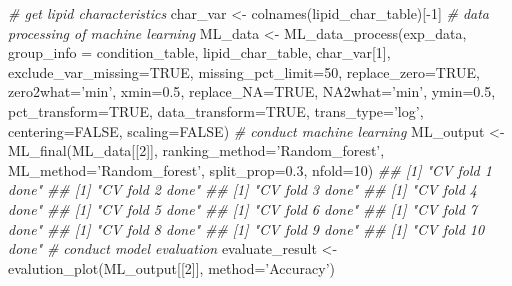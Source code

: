 \documentclass[]{article}
\newcommand{\hlnum}[1]{\textcolor[rgb]{0.816,0.125,0.439}{#1}}%
\newcommand{\hlstr}[1]{\textcolor[rgb]{0.251,0.627,0.251}{#1}}%
\newcommand{\hlcom}[1]{\textcolor[rgb]{0.502,0.502,0.502}{\textit{#1}}}%
\newcommand{\hlopt}[1]{\textcolor[rgb]{0,0,0}{#1}}%
\newcommand{\hlstd}[1]{\textcolor[rgb]{0.251,0.251,0.251}{#1}}%
\newcommand{\hlkwc}[1]{\textcolor[rgb]{0.251,0.251,0.251}{#1}}%
\newcommand{\hlkwd}[1]{\textcolor[rgb]{0.878,0.439,0.125}{#1}}%
\newenvironment{Shaded}{\begin{myshaded}}{\end{myshaded}}
\newcommand{\KeywordTok}[1]{\hlkwd{#1}}
\newcommand{\DataTypeTok}[1]{\hlkwc{#1}}
\newcommand{\DecValTok}[1]{\hlnum{#1}}
\newcommand{\FloatTok}[1]{\hlnum{#1}}
\newcommand{\StringTok}[1]{\hlstr{#1}}
\newcommand{\CommentTok}[1]{\hlcom{#1}}
\newcommand{\OtherTok}[1]{{#1}}
\newcommand{\OperatorTok}[1]{\hlopt{#1}}
\newcommand{\NormalTok}[1]{\hlstd{#1}}
\begin{document}
\begin{Shaded}
\begin{Highlighting}[]
\CommentTok{# get lipid characteristics}
\NormalTok{char_var <-}\StringTok{ }\KeywordTok{colnames}\NormalTok{(lipid_char_table)[}\OperatorTok{-}\DecValTok{1}\NormalTok{]}
\CommentTok{# data processing of machine learning}
\NormalTok{ML_data <-}\StringTok{ }\KeywordTok{ML_data_process}\NormalTok{(exp_data, }\DataTypeTok{group_info =}\NormalTok{ condition_table,}
\NormalTok{                           lipid_char_table, char_var[}\DecValTok{1}\NormalTok{],}
                           \DataTypeTok{exclude_var_missing=}\OtherTok{TRUE}\NormalTok{, }\DataTypeTok{missing_pct_limit=}\DecValTok{50}\NormalTok{,}
                           \DataTypeTok{replace_zero=}\OtherTok{TRUE}\NormalTok{, }\DataTypeTok{zero2what=}\StringTok{'min'}\NormalTok{, }\DataTypeTok{xmin=}\FloatTok{0.5}\NormalTok{,}
                           \DataTypeTok{replace_NA=}\OtherTok{TRUE}\NormalTok{, }\DataTypeTok{NA2what=}\StringTok{'min'}\NormalTok{, }\DataTypeTok{ymin=}\FloatTok{0.5}\NormalTok{,}
                           \DataTypeTok{pct_transform=}\OtherTok{TRUE}\NormalTok{, }\DataTypeTok{data_transform=}\OtherTok{TRUE}\NormalTok{,}
                           \DataTypeTok{trans_type=}\StringTok{'log'}\NormalTok{, }\DataTypeTok{centering=}\OtherTok{FALSE}\NormalTok{, }\DataTypeTok{scaling=}\OtherTok{FALSE}\NormalTok{)}
\CommentTok{# conduct machine learning}
\NormalTok{ML_output <-}\StringTok{ }\KeywordTok{ML_final}\NormalTok{(ML_data[[}\DecValTok{2}\NormalTok{]], }\DataTypeTok{ranking_method=}\StringTok{'Random_forest'}\NormalTok{,}
                      \DataTypeTok{ML_method=}\StringTok{'Random_forest'}\NormalTok{, }\DataTypeTok{split_prop=}\FloatTok{0.3}\NormalTok{, }\DataTypeTok{nfold=}\DecValTok{10}\NormalTok{)}
\CommentTok{## [1] "CV fold 1 done"}
\CommentTok{## [1] "CV fold 2 done"}
\CommentTok{## [1] "CV fold 3 done"}
\CommentTok{## [1] "CV fold 4 done"}
\CommentTok{## [1] "CV fold 5 done"}
\CommentTok{## [1] "CV fold 6 done"}
\CommentTok{## [1] "CV fold 7 done"}
\CommentTok{## [1] "CV fold 8 done"}
\CommentTok{## [1] "CV fold 9 done"}
\CommentTok{## [1] "CV fold 10 done"}
\CommentTok{# conduct model evaluation}
\NormalTok{evaluate_result <-}\StringTok{ }\KeywordTok{evalution_plot}\NormalTok{(ML_output[[}\DecValTok{2}\NormalTok{]], }\DataTypeTok{method=}\StringTok{'Accuracy'}\NormalTok{)}


\end{Highlighting}
\end{Shaded}
\end{document}
